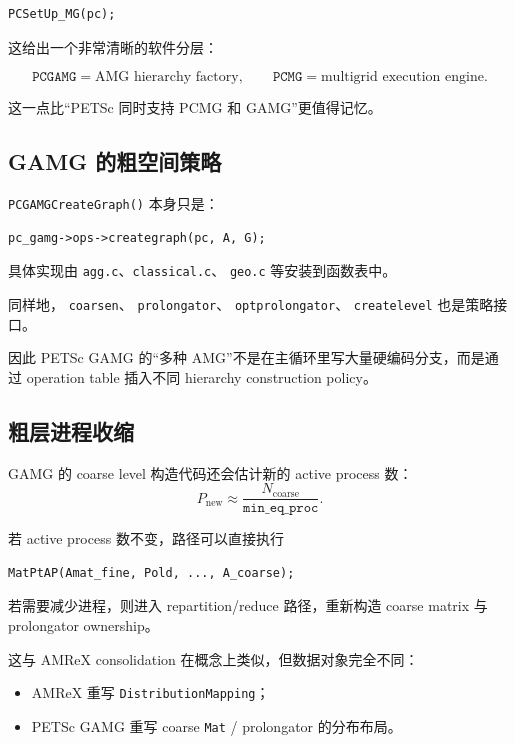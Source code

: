 \begin{verbatim}
PCSetUp_MG(pc);
\end{verbatim}

这给出一个非常清晰的软件分层：

\begin{equation}
\boxed{
\texttt{PCGAMG}
=
\text{AMG hierarchy factory},
\qquad
\texttt{PCMG}
=
\text{multigrid execution engine}.
}
\label{eq:software-petsc-gamg-mg}
\end{equation}

这一点比“PETSc 同时支持 PCMG 和 GAMG”更值得记忆。

\subsection{GAMG 的粗空间策略}

\texttt{PCGAMGCreateGraph()} 本身只是：

\begin{verbatim}
pc_gamg->ops->creategraph(pc, A, G);
\end{verbatim}

具体实现由 \texttt{agg.c}、\texttt{classical.c}、
\texttt{geo.c} 等安装到函数表中。

同样地，
\texttt{coarsen}、
\texttt{prolongator}、
\texttt{optprolongator}、
\texttt{createlevel}
也是策略接口。

因此 PETSc GAMG 的“多种 AMG”不是在主循环里写大量硬编码分支，而是通过 operation table 插入不同 hierarchy construction policy。

\subsection{粗层进程收缩}

GAMG 的 coarse level 构造代码还会估计新的 active process 数：
\begin{equation}
P_{\mathrm{new}}
\approx
\frac{N_{\mathrm{coarse}}}
{\texttt{min\_eq\_proc}}.
\end{equation}

若 active process 数不变，路径可以直接执行
\begin{verbatim}
MatPtAP(Amat_fine, Pold, ..., A_coarse);
\end{verbatim}

若需要减少进程，则进入 repartition/reduce 路径，重新构造 coarse matrix 与 prolongator ownership。

这与 AMReX consolidation 在概念上类似，但数据对象完全不同：

\begin{itemize}
\item AMReX 重写 \texttt{DistributionMapping}；
\item PETSc GAMG 重写 coarse \texttt{Mat} / prolongator 的分布布局。
\end{itemize}

